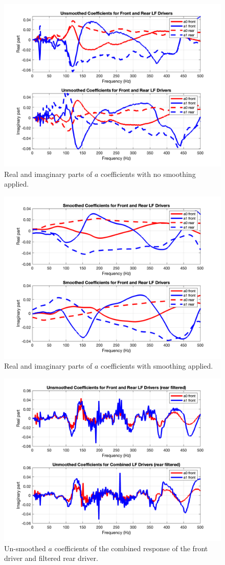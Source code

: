 \documentclass{report}
\begin{document}
    \begin{figure}[H]
        \centering
        \includegraphics[width = 0.75 \linewidth]{figs/acoeffsNoSmooth.png}%
        \caption{Real and imaginary parts of $a$ coefficients with no smoothing applied.}
        \label{acoeffsNoSmooth}
    \end{figure}

    \begin{figure}[H]
        \centering
        \includegraphics[width = 0.75 \linewidth]{figs/acoeffsSmooth.png}%
        \caption{Real and imaginary parts of $a$ coefficients with smoothing applied.}
        \label{acoeffsSmooth}
    \end{figure}

    \begin{figure}[H]
        \centering
        \includegraphics[width = 0.75 \linewidth]{figs/filteredaCoeffNoSmooth.png}
        \caption{Un-smoothed $a$ coefficients of the combined response of the front driver and filtered rear driver.}
        \label{filteredaCoeffNoSmooth}
    \end{figure}
\end{document}
